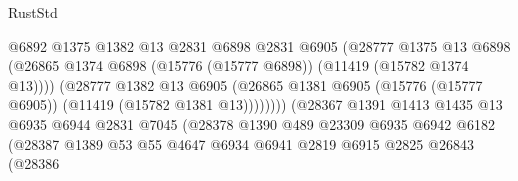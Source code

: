 \begin{lexlean}{RustStd}
\begin{coremodule}
                                          @6892
                                          @1375
                                          @1382
                                          @13
                                          @2831
                                          @6898
                                          @2831
                                          @6905
                                          (@28777
                                            @1375
                                            @13
                                            @6898
                                            (@26865
                                              @1374
                                              @6898
                                              (@15776 (@15777 @6898))
                                              (@11419 (@15782 @1374 @13))))
                                          (@28777
                                            @1382
                                            @13
                                            @6905
                                            (@26865
                                              @1381
                                              @6905
                                              (@15776 (@15777 @6905))
                                              (@11419 (@15782 @1381 @13))))))))
                                  (@28367
                                    @1391
                                    @1413
                                    @1435
                                    @13
                                    @6935
                                    @6944
                                    @2831
                                    @7045
                                    (@28378
                                      @1390
                                      @489
                                      @23309
                                      @6935
                                      @6942
                                      @6182
                                      (@28387
                                        @1389
                                        @53
                                        @55
                                        @4647
                                        @6934
                                        @6941
                                        @2819
                                        @6915
                                        @2825
                                        @26843
                                        (@28386

\end{coremodule}
\end{lexlean}
